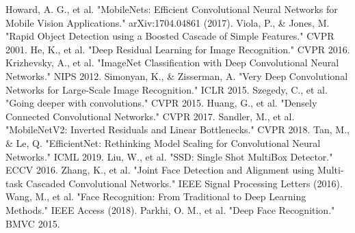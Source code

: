 \documentclass[conference]{IEEEtran}
\begin{document}
\begin{thebibliography}{00}
 Howard, A. G., et al. "MobileNets: Efficient Convolutional Neural Networks for Mobile Vision Applications." arXiv:1704.04861 (2017).
 Viola, P., \& Jones, M. "Rapid Object Detection using a Boosted Cascade of Simple Features." CVPR 2001.
 He, K., et al. "Deep Residual Learning for Image Recognition." CVPR 2016.
 Krizhevsky, A., et al. "ImageNet Classification with Deep Convolutional Neural Networks." NIPS 2012.
 Simonyan, K., \& Zisserman, A. "Very Deep Convolutional Networks for Large-Scale Image Recognition." ICLR 2015.
 Szegedy, C., et al. "Going deeper with convolutions." CVPR 2015.
 Huang, G., et al. "Densely Connected Convolutional Networks." CVPR 2017.
 Sandler, M., et al. "MobileNetV2: Inverted Residuals and Linear Bottlenecks." CVPR 2018.
 Tan, M., \& Le, Q. "EfficientNet: Rethinking Model Scaling for Convolutional Neural Networks." ICML 2019.
 Liu, W., et al. "SSD: Single Shot MultiBox Detector." ECCV 2016.
 Zhang, K., et al. "Joint Face Detection and Alignment using Multi-task Cascaded Convolutional Networks." IEEE Signal Processing Letters (2016).
 Wang, M., et al. "Face Recognition: From Traditional to Deep Learning Methods." IEEE Access (2018).
 Parkhi, O. M., et al. "Deep Face Recognition." BMVC 2015.
\end{thebibliography}
\end{document}
